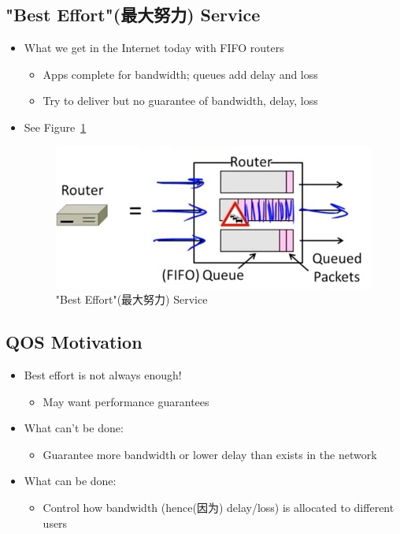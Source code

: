 \documentclass[12pt]{ctexart}   %
\begin{document}
	\subsection{"Best Effort"(最大努力) Service}
	\begin{itemize}
		\item What we get in the Internet today with FIFO routers
		\begin{itemize}
			\item Apps complete for bandwidth; queues add delay and loss
			\item Try to deliver but no guarantee of bandwidth, delay, loss
		\end{itemize}
		\item See Figure~\ref{fig:9-1-2}
		  
		 \begin{figure}[h!] %
		\centering
		 \includegraphics[scale=0.7]{images/9-1-2}
		\caption{ "Best Effort"(最大努力) Service }
		 \label{fig:9-1-2}
		 \end{figure}
	\end{itemize}
	
	\subsection{QOS Motivation}
	\begin{itemize}
		\item Best effort is not always enough!
		\begin{itemize}
			\item May want performance guarantees
		\end{itemize}
		
		\item What can't be done:
		\begin{itemize}
			\item Guarantee more bandwidth or lower delay than exists in the network
		\end{itemize}
		
		\item What can be done:
		\begin{itemize}
			\item Control how bandwidth (hence(因为) delay/loss) is allocated to different users
		\end{itemize}
	\end{itemize}
	
\end{document}
